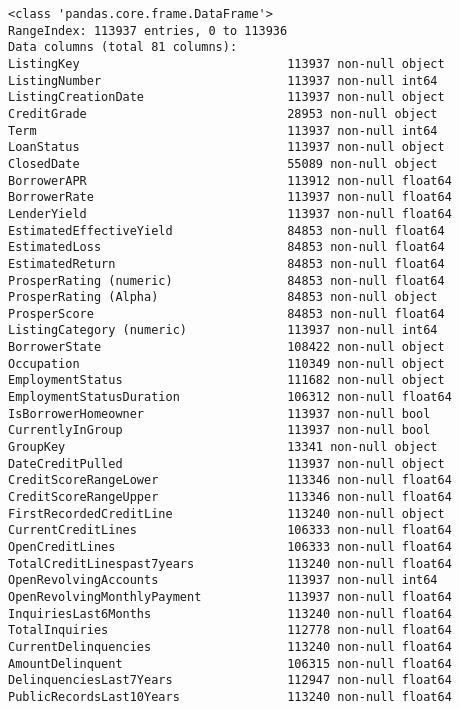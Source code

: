 \documentclass[11pt]{article}
\begin{document}
    \begin{Verbatim}[commandchars=\\\{\}]
<class 'pandas.core.frame.DataFrame'>
RangeIndex: 113937 entries, 0 to 113936
Data columns (total 81 columns):
ListingKey                             113937 non-null object
ListingNumber                          113937 non-null int64
ListingCreationDate                    113937 non-null object
CreditGrade                            28953 non-null object
Term                                   113937 non-null int64
LoanStatus                             113937 non-null object
ClosedDate                             55089 non-null object
BorrowerAPR                            113912 non-null float64
BorrowerRate                           113937 non-null float64
LenderYield                            113937 non-null float64
EstimatedEffectiveYield                84853 non-null float64
EstimatedLoss                          84853 non-null float64
EstimatedReturn                        84853 non-null float64
ProsperRating (numeric)                84853 non-null float64
ProsperRating (Alpha)                  84853 non-null object
ProsperScore                           84853 non-null float64
ListingCategory (numeric)              113937 non-null int64
BorrowerState                          108422 non-null object
Occupation                             110349 non-null object
EmploymentStatus                       111682 non-null object
EmploymentStatusDuration               106312 non-null float64
IsBorrowerHomeowner                    113937 non-null bool
CurrentlyInGroup                       113937 non-null bool
GroupKey                               13341 non-null object
DateCreditPulled                       113937 non-null object
CreditScoreRangeLower                  113346 non-null float64
CreditScoreRangeUpper                  113346 non-null float64
FirstRecordedCreditLine                113240 non-null object
CurrentCreditLines                     106333 non-null float64
OpenCreditLines                        106333 non-null float64
TotalCreditLinespast7years             113240 non-null float64
OpenRevolvingAccounts                  113937 non-null int64
OpenRevolvingMonthlyPayment            113937 non-null float64
InquiriesLast6Months                   113240 non-null float64
TotalInquiries                         112778 non-null float64
CurrentDelinquencies                   113240 non-null float64
AmountDelinquent                       106315 non-null float64
DelinquenciesLast7Years                112947 non-null float64
PublicRecordsLast10Years               113240 non-null float64

\end{Verbatim}
\end{document}
